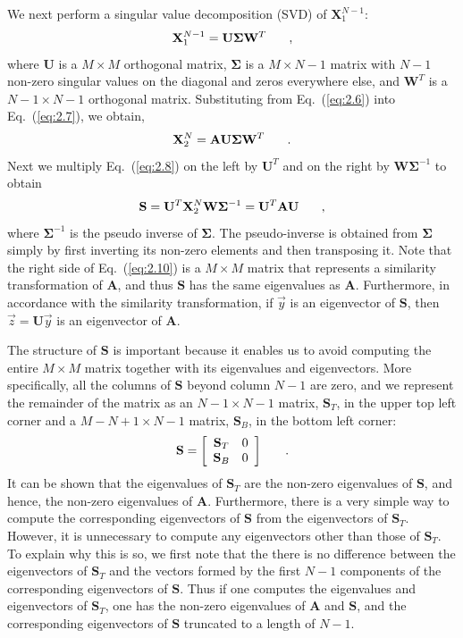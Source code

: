 \documentclass{style/nseJournal}
\newcommand{\bracket}[1]{\left[ #1 \right]}
\renewcommand{\vec}[1]{\overrightarrow{#1}}
\newcommand{\be}{\begin{equation}}
\newcommand{\ee}{\end{equation}}
\newcommand{\pec}{\hspace{0.25in},}
\newcommand{\pep}{\hspace{0.25in}.}
\newcommand{\LEQ}[1]{\label{eq:#1}}
\newcommand{\EQ}[1]{Eq.~(\ref{eq:#1})}
\newcommand{\mA}{\mathbf{A}}
\newcommand{\mX}{\mathbf{X}}
\newcommand{\mU}{\mathbf{U}}
\newcommand{\mW}{\mathbf{W}}
\newcommand{\mSigma}{\mathbf{\Sigma}}
\newcommand{\mS}{\mathbf{S}}
\begin{document}
We next perform a singular value decomposition (SVD) of $\mX_{1}^{N-1}$:
\be
	\mX_{1}^{N-1} = \mU \mSigma \mW^T \pec
\LEQ{2.7}
\ee
where $\mU$ is a $M \times M$ orthogonal matrix, $\mSigma$ is a $M\times N-1$ matrix with $N-1$ non-zero singular values on the diagonal and zeros everywhere else, and $\mW^T$ is a $N-1 \times N-1$ orthogonal matrix.  
Substituting from \EQ{2.6} into \EQ{2.7}, we obtain, 
\be
	\mX_2^{N} = \mA \mU \mSigma \mW^T \pep
\LEQ{2.8}
\ee
Next we multiply \EQ{2.8} on the left by $\mU^{T}$ and on the right by
$\mW\mSigma^{-1}$ to obtain 
\be
	\mS = \mU^{T}\mX_2^{N}\mW\mSigma^{-1} = \mU^{T}\mA\mU \pec
	\LEQ{2.10}
\ee
where $\mSigma^{-1}$ is the pseudo inverse of $\mSigma$.  
The pseudo-inverse is obtained from $\mSigma$ simply by first inverting its non-zero elements and then transposing it.  
Note that the right side of \EQ{2.10} is a $M \times M$ matrix that represents a similarity transformation of $\mA$, and thus $\mS$ has the same eigenvalues as $\mA$.  
Furthermore, in accordance with the similarity transformation, if $\vec{y}$ is an eigenvector of $\mS$, then $\vec{z} = \mU \vec{y}$ is an eigenvector of $\mA$.  

The structure of $\mS$ is important because it enables us to avoid computing the entire $M \times M$ matrix together with its eigenvalues and eigenvectors.  
More specifically, all the columns of $\mS$ beyond column $N-1$ are zero, and we represent the remainder of the matrix as an $N-1 \times N-1$ matrix, $\mS_{T}$, in the upper top left corner and a $M-N+1 \times N-1$ matrix, $\mS_B$, in the bottom left corner:
\be
	\mS = \bracket{
		\begin{array}{cc}
			\mS_T  & 0 \\
			\mS_B & 0  
		\end{array}
	} \pep
	\LEQ{2.11}
\ee
It can be shown that the eigenvalues of $\mS_T$ are the non-zero eigenvalues of $\mS$, and hence, the non-zero eigenvalues of $\mA$.  
Furthermore, there is a very simple way to compute the corresponding eigenvectors of $\mS$ from the eigenvectors of $\mS_T$.  
However, it is unnecessary to compute any eigenvectors other than those of $\mS_T$.  
To explain why this is so, we first note that the there is no difference between the eigenvectors of $\mS_T$ and the vectors formed by the first $N-1$ components of the corresponding eigenvectors of $\mS$.  
Thus if one computes the eigenvalues and eigenvectors of $\mS_T$, one has the non-zero eigenvalues of $\mA$ and $\mS$, and the corresponding eigenvectors of $\mS$ truncated to a length of $N-1$.
\end{document}
